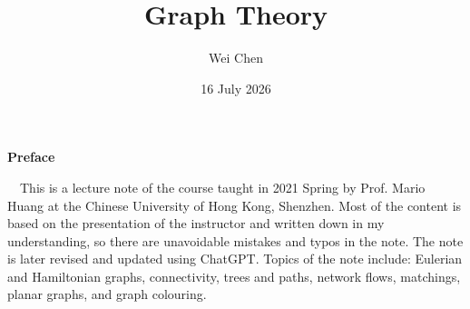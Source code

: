 \documentclass[11pt,oneside]{book}
\title{\Huge \textbf{Graph Theory}}
\author{Wei Chen}
\date{16 July 2026}
\theoremstyle{mystyle}
\begin{document}
\maketitle
	\allowdisplaybreaks
	\setcounter{page}{1}
	\begin{center}
		\Large\textbf{Preface}
    \end{center}~\
    This is a lecture note of the course  taught in 2021 Spring by Prof. Mario Huang at the Chinese University of Hong Kong, Shenzhen. Most of the content is based on
the presentation of the instructor and written down in my understanding, so there are unavoidable mistakes and typos in the note. The note is later revised and updated using ChatGPT. Topics of the note include: Eulerian and Hamiltonian graphs, connectivity, trees and paths, network flows, matchings, planar graphs, and graph colouring. 
	\newpage
	\tableofcontents








\end{document}
